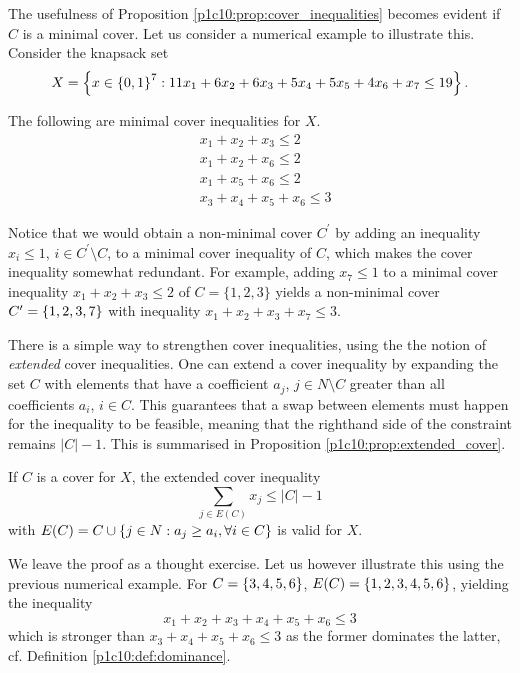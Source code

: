 The usefulness of Proposition \ref{p1c10:prop:cover_inequalities} becomes evident if $C$ is a minimal cover. Let us consider a numerical example to illustrate this. Consider the knapsack set 
%
\begin{equation*}
	X = \left\{ x \in \left\{ 0,1 \right \}^7 : 11x_1 + 6x_2 + 6x_3 + 5x_4 + 5x_5 + 4x_6 + x_7 \leq 19 \right \}.	
\end{equation*}

The following are minimal cover inequalities for $X$. 
%
\begin{align*}
&x_1 + x_2 + x_3 \leq 2\\
&x_1 + x_2 +x_6 \leq 2\\
&x_1 + x_5 + x_6 \leq 2\\
&x_3 + x_4 + x_5 + x_6 \leq 3
\end{align*}

Notice that we would obtain a non-minimal cover $C^\prime$ by adding an inequality $x_i \leq 1$, $i \in C^\prime\setminus C$, to a minimal cover inequality of $C$, which makes the cover inequality somewhat redundant. For example, adding $x_7 \leq 1$ to a minimal cover inequality $x_1 + x_2 + x_3 \leq 2$ of $C = \{1,2,3\}$ yields a non-minimal cover $C^\prime = \left\{ 1,2,3,7 \right \}$ with inequality $x_1 + x_2 + x_3 + x_7 \leq 3$.

There is a simple way to strengthen cover inequalities, using the the notion of \emph{extended} cover inequalities. One can extend a cover inequality by expanding the set $C$ with elements that have a coefficient $a_j$, $j \in N \setminus C$ greater than all coefficients $a_i$, $i \in C$. This guarantees that a swap between elements must happen for the inequality to be feasible, meaning that the righthand side of the constraint remains $|C| - 1$. This is summarised in Proposition \ref{p1c10:prop:extended_cover}.

\begin{proposition} \label{p1c10:prop:extended_cover}
	If $C$ is a cover for $X$, the extended cover inequality
	\begin{equation*}
		\sum_{j \in E(C)} x_j \leq |C|-1
	\end{equation*}
	with $E(C) = C \cup \left\{ j\in N: a_j \geq a_i, \forall i \in C \right \}$ is valid for $X$.
\end{proposition}

We leave the proof as a thought exercise. Let us however illustrate this using the previous numerical example. For $C = \left\{ 3,4,5,6 \right \}$, $E(C) = \left\{ 1,2,3,4,5,6 \right \}$, yielding the inequality 
%
\begin{equation*}
	x_1 + x_2 + x_3 + x_4 + x_5 + x_6 \leq 3	
\end{equation*}
%
which is stronger than $x_3 + x_4 + x_5 + x_6 \leq 3$ as the former dominates the latter, cf. Definition \ref{p1c10:def:dominance}. 


